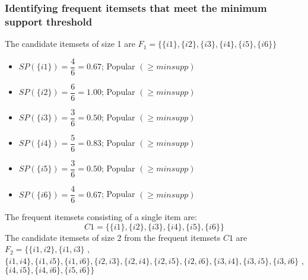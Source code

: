 \subsubsection{Identifying frequent itemsets that meet the minimum support threshold}
The candidate itemsets of size 1 are \(F_1=\{\{i1\},\{i2\},\{i3\},\{i4\},\{i5\},\{i6\}\}\)
\begin{itemize}
\item \(SP(\{i1\})=\dfrac{4}{6}=0.67\); Popular \((\geq minsupp)\)
\item \(SP(\{i2\})=\dfrac{6}{6}=1.00\); Popular  \((\geq minsupp)\)
\item \(SP(\{i3\})=\dfrac{3}{6}=0.50\); Popular  \((\geq minsupp)\)
\item \(SP(\{i4\})=\dfrac{5}{6}=0.83\); Popular  \((\geq minsupp)\)
\item \(SP(\{i5\})=\dfrac{3}{6}=0.50\); Popular  \((\geq minsupp)\)
\item \(SP(\{i6\})=\dfrac{4}{6}=0.67\); Popular  \((\geq minsupp)\)
\end{itemize}
The frequent itemsets consisting of a single item are: \[C1=\{\{i1\},\{i2\},\{i3\},\{i4\},\{i5\},\{i6\}\}\]
The candidate itemsets of size 2 from the frequent itemsets \(C1\) are \(F_2=\{\{i1,i2\},\{i1,i3\}\) , \(\{i1,i4\},\{i1,i5\},\{i1,i6\},\{i2,i3\},\{i2,i4\},\{i2,i5\},\{i2,i6\},\{i3,i4\},\{i3,i5\},\{i3,i6\}\) , \(\{i4,i5\},\{i4,i6\},\{i5,i6\}\}\)
